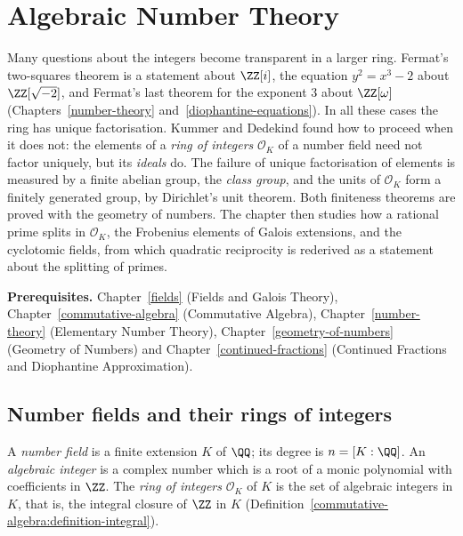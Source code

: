 \chapter{Algebraic Number Theory}\label{algebraic-number-theory}

Many questions about the integers become transparent in a larger ring. Fermat's two-squares theorem is a statement about $\ZZ[i]$, the equation $y^2 = x^3 - 2$ about $\ZZ[\sqrt{-2}]$, and Fermat's
last theorem for the exponent $3$ about $\ZZ[\omega]$ (Chapters~\ref{number-theory} and~\ref{diophantine-equations}). In all these cases the ring has unique factorisation. Kummer and Dedekind found
how to proceed when it does not: the elements of a \emph{ring of integers} $\mathcal{O}_K$ of a number field need not factor uniquely, but its \emph{ideals} do. The failure of unique factorisation of
elements is measured by a finite abelian group, the \emph{class group}, and the units of $\mathcal{O}_K$ form a finitely generated group, by Dirichlet's unit theorem. Both finiteness theorems are proved
with the geometry of numbers. The chapter then studies how a rational prime splits in $\mathcal{O}_K$, the Frobenius elements of Galois extensions, and the cyclotomic fields, from which quadratic
reciprocity is rederived as a statement about the splitting of primes.

\noindent\textbf{Prerequisites.} Chapter~\ref{fields} (Fields and Galois Theory), Chapter~\ref{commutative-algebra} (Commutative Algebra), Chapter~\ref{number-theory} (Elementary Number Theory),
Chapter~\ref{geometry-of-numbers} (Geometry of Numbers) and Chapter~\ref{continued-fractions} (Continued Fractions and Diophantine Approximation).

\section{Number fields and their rings of integers}\label{algebraic-number-theory:section-number-fields}

\begin{definition}\label{algebraic-number-theory:definition-number-field}
A \emph{number field} is a finite extension $K$ of $\QQ$; its degree is $n = [K : \QQ]$. An \emph{algebraic integer} is a complex number which is a root of a monic polynomial with coefficients in
$\ZZ$. The \emph{ring of integers} $\mathcal{O}_K$ of $K$ is the set of algebraic integers in $K$, that is, the integral closure of $\ZZ$ in $K$
(Definition~\ref{commutative-algebra:definition-integral}).
\end{definition}

